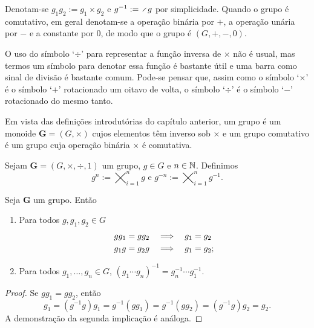\begin{notation}
Denotam-se $g_1g_2 := g_1 \times g_2$ e $g\inv := \div g$ por simplicidade. Quando o grupo é comutativo, em geral denotam-se a operação binária por $+$, a operação unária por $-$ e a constante por $0$, de modo que o grupo é $(G,+,-,0)$.
\end{notation}

O uso do símbolo `$\div$' para representar a função inversa de $\times$ não é usual, mas termos um símbolo para denotar essa função é bastante útil e uma barra como sinal de divisão é bastante comum. Pode-se pensar que, assim como o símbolo `$\times$' é o símbolo `$+$' rotacionado um oitavo de volta, o símbolo `$\div$' é o símbolo `$-$' rotacionado do mesmo tanto.

Em vista das definições introdutórias do capítulo anterior, um grupo é um monoide $\bm G=(G, \times)$ cujos elementos têm inverso sob $\times$ e um grupo comutativo é um grupo cuja operação binária $\times$ é comutativa.

\begin{definition}
Sejam $\bm G = (G,\times,\div,1)$ um grupo, $g \in G$ e $n \in \mathbb{N}$. Definimos
	\begin{equation*}
	g^n := \bigtimes_{i=1}^n g \text{\ \ e\ \ } g^{-n} := \bigtimes_{i=1}^n g^{-1}.
	\end{equation*}
\end{definition}

\begin{proposition}
	Seja $\bm G$ um grupo. Então
	\begin{enumerate}
	\item Para todos $g,g_1,g_2 \in G$ 
		\begin{align*}
		gg_1 = gg_2 &\quad \Longrightarrow \quad g_1 = g_2 \\
		g_1g = g_2g &\quad \Longrightarrow \quad g_1 = g_2;
		\end{align*}
	\item Para todos $g_1,\ldots,g_n \in G$, $(g_1 \cdots g_n)^{-1}=g_n^{-1} \cdots g_1^{-1}$.
	\end{enumerate}
\end{proposition}
\begin{proof}
	Se $g g_1 = g g_2$, então
	\begin{equation*}
	g_1 = (g^{-1}g)g_1 = g^{-1}(gg_1) = g^{-1}(gg_2) = (g^{-1}g)g_2 = g_2.
	\end{equation*}
A demonstração da segunda implicação é análoga.
\end{proof}

